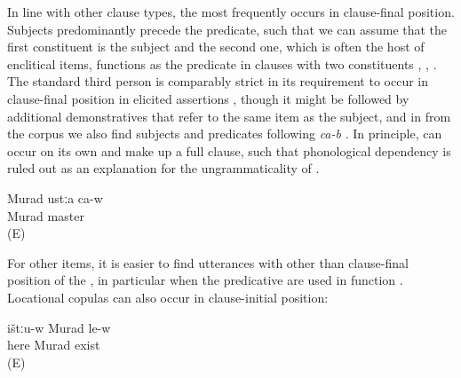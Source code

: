In line with other clause types, the  most frequently occurs in clause-final position. Subjects predominantly precede the predicate, such that we can assume that the first  constituent is the  subject and the second one, which is often the host of enclitical  items, functions as the predicate in clauses with two  constituents , , . The standard third person   is comparably strict in its requirement to occur in clause-final position in elicited assertions , though it might be followed by additional demonstratives that refer to the same item as the subject, and in  from the corpus we also find  subjects and predicates following \textit{ca-b} . In principle,  can occur on its own and make up a full clause, such that phonological dependency is ruled out as an explanation for the ungrammaticality of . 


\begin{exe}
	\ex	\label{ex:Murad is a / the master}
	\begin{xlist}
		\ex	\label{ex:Murad is a / the master@A}
		\gll	Murad	ustːa ca-w\\
			Murad master \\
		\glt	{} (E)
	
		 \label{ex:Murad is a / the master@B}
		 \label{ex:Murad is a / the master@C}
	\end{xlist}
\end{exe}

For other  items, it is easier to find utterances with other than clause-final position of the , in particular when the predicative  are used in  function . Locational copulas can also occur in clause-initial position:
%
\begin{exe}
	\ex	\label{ex:Murad is here}
	\begin{xlist}
		\ex	\label{ex:Murad is here@A}
		\gll	ištːu-w	Murad	le-w\\
			here	Murad	exist\tsc{-m}\\
		\glt	\sqt{Murad is here.} (E)
	
		\ex	{}	\label{ex:Murad is here@B}
	\end{xlist}
\end{exe}

